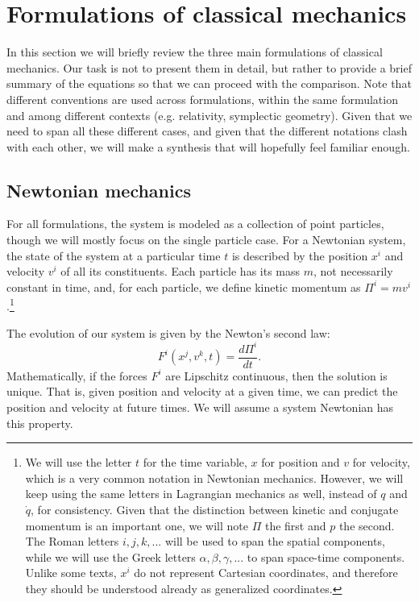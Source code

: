 \section{Formulations of classical mechanics}

In this section we will briefly review the three main formulations of classical mechanics. Our task is not to present them in detail, but rather to provide a brief summary of the equations so that we can proceed with the comparison. Note that different conventions are used across formulations, within the same formulation and among different contexts (e.g. relativity, symplectic geometry). Given that we need to span all these different cases, and given that the different notations clash with each other, we will make a synthesis that will hopefully feel familiar enough.

\subsection{Newtonian mechanics}

For all formulations, the system is modeled as a collection of point particles, though we will mostly focus on the single particle case. For a Newtonian system, the state of the system at a particular time $t$ is described by the position $x^i$ and velocity $v^i$ of all its constituents. Each particle has its mass $m$, not necessarily constant in time, and, for each particle, we define kinetic momentum as $\Pi^i = m v^i$.\footnote{We will use the letter $t$ for the time variable, $x$ for position and $v$ for velocity, which is a very common notation in Newtonian mechanics. However, we will keep using the same letters in Lagrangian mechanics as well, instead of $q$ and $\dot{q}$, for consistency. Given that the distinction between kinetic and conjugate momentum is an important one, we will note $\Pi$ the first and $p$ the second. The Roman letters $i,j,k,...$ will be used to span the spatial components, while we will use the Greek letters $\alpha, \beta, \gamma, ...$ to span space-time components. Unlike some texts, $x^i$ do not represent Cartesian coordinates, and therefore they should be understood already as generalized coordinates.}

The evolution of our system is given by the Newton's second law:
\begin{equation}\label{rp-cm-NewtonsSecondLaw}
	F^i(x^j, v^k, t) = \frac{d \Pi^i}{dt}.
\end{equation}
Mathematically, if the forces $F^i$ are Lipschitz continuous, then the solution is unique. That is, given position and velocity at a given time, we can predict the position and velocity at future times. We will assume a system Newtonian has this property.

